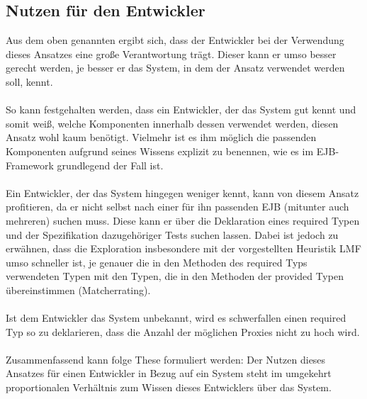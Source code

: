 \subsection{Nutzen für den Entwickler}
Aus dem oben genannten ergibt sich, dass der Entwickler bei der Verwendung dieses Ansatzes eine große Verantwortung trägt. Dieser kann er umso besser gerecht werden, je besser er das System, in dem der Ansatz verwendet werden soll, kennt. 
\\\\
So kann festgehalten werden, dass ein Entwickler, der das System gut kennt und somit weiß, welche Komponenten innerhalb dessen verwendet werden, diesen Ansatz wohl kaum benötigt. Vielmehr ist es ihm möglich die passenden Komponenten aufgrund seines Wissens explizit zu benennen, wie es im EJB-Framework grundlegend der Fall ist.
\\\\
Ein Entwickler, der das System hingegen weniger kennt, kann von diesem Ansatz profitieren, da er nicht selbst nach einer für ihn passenden EJB (mitunter auch mehreren) suchen muss. Diese kann er über die Deklaration eines required Typen und der Spezifikation dazugehöriger Tests suchen lassen. Dabei ist jedoch zu erwähnen, dass die Exploration insbesondere mit der vorgestellten Heuristik LMF umso schneller ist, je genauer die in den Methoden des required Typs verwendeten Typen mit den Typen, die in den Methoden der provided Typen übereinstimmen (Matcherrating).
\\\\
Ist dem Entwickler das System unbekannt, wird es schwerfallen einen required Typ so zu deklarieren, dass die Anzahl der möglichen Proxies nicht zu hoch wird. 
\\\\
Zusammenfassend kann folge These formuliert werden: Der Nutzen dieses Ansatzes für einen Entwickler in Bezug auf ein System steht im umgekehrt proportionalen Verhältnis zum Wissen dieses Entwicklers über das System. 

